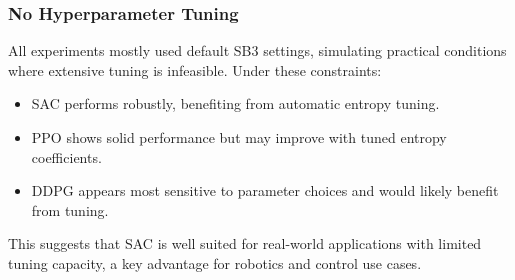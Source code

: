 \subsubsection{No Hyperparameter Tuning}
All experiments mostly used default \gls{SB3} settings, simulating practical conditions where extensive tuning is infeasible. Under these constraints:
\begin{itemize}
    \item \gls{SAC} performs robustly, benefiting from automatic entropy tuning.
    \item \gls{PPO} shows solid performance but may improve with tuned entropy coefficients. %
    \item \gls{DDPG} appears most sensitive to parameter choices and would likely benefit from tuning.
\end{itemize}
This suggests that \gls{SAC} is well suited for real-world applications with limited tuning capacity, a key advantage for robotics and control use cases.




